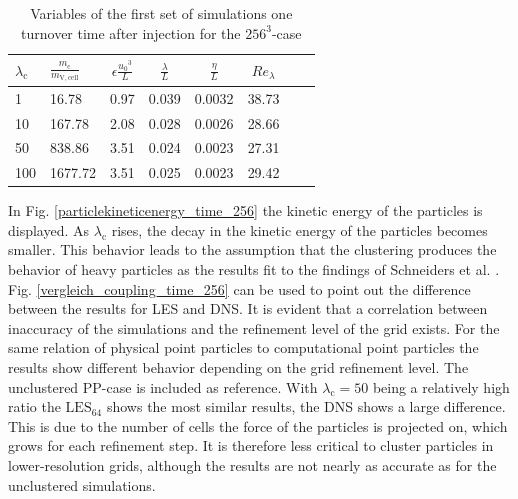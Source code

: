 \documentclass[11pt,a4paper,openany,oneside,parskip=half*]{article}
\begin{document}
\begin{table}[h]
	\begin{center}
	\begin{tabular}{l l | c c c c c c }
	$\lambda_\mathrm{c}$& $\frac{m_\mathrm{c}}{m_\mathrm{V,cell}}$ & $\epsilon \frac{{u_0}^3}{L}$ & $\frac{\lambda}{L}$ & $\frac{\eta}{L} $ & $Re_\lambda$ \\
	\hline
	\hline
	1 &16.78 & 0.97& 0.039 & 0.0032 & 38.73 &\\
	10 &167.78 & 2.08 & 0.028 & 0.0026 & 28.66 &\\
	50 &838.86 & 3.51 & 0.024 & 0.0023 & 27.31 &\\
	100 &1677.72 & 3.51 & 0.025 & 0.0023 & 29.42 &\\
	\hline
	\end{tabular}
	\captionsetup{width=0.9\linewidth}
	\caption{Variables of the first set of simulations one turnover time after injection for the $256^3$-case}
	\label{table_values}
	\end{center}
	\end{table}
In Fig. \ref{particlekineticenergy_time_256} the kinetic energy of the particles is displayed. As $\lambda_\mathrm{c}$ rises, the decay in the kinetic energy of the particles becomes smaller. This behavior leads to the assumption that the clustering produces the behavior of heavy particles as the results fit to the findings of Schneiders et al. \cite{Schneiders2017}. Fig. \ref{vergleich_coupling_time_256} can be used to point out the difference between the results for LES and DNS. It is evident that a correlation between inaccuracy of the simulations and the refinement level of the grid exists. For the same relation of physical point particles to computational point particles the results show different behavior depending on the grid refinement level. The unclustered PP-case is included as reference. With $\lambda_\mathrm{c}=50$ being a relatively high ratio the $\mathrm{LES}_\mathrm{64}$ shows the most similar results, the DNS shows a large difference. This is due to the number of cells the force of the particles is projected on, which grows for each refinement step. It is therefore less critical to cluster particles in lower-resolution grids, although the results are not nearly as accurate as for the unclustered simulations. 
\end{document}
